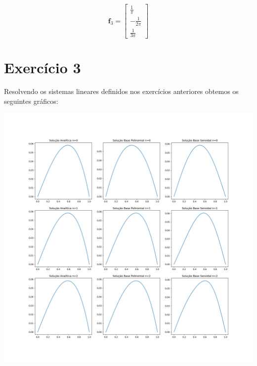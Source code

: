 \documentclass{article}
\begin{document}
\[
\mathbf{f}_{3} = \begin{bmatrix}
    \frac{1}{\pi} \\
    -\frac{1}{2\pi} \\
    \frac{1}{3\pi}
    \end{bmatrix}
\]

\section{Exercício 3}
Resolvendo os sistemas lineares definidos nos exercícios anteriores obtemos os seguintes gráficos:

\begin{center}
    \includegraphics[width=1\textwidth]{exercicio123_solucao.png}
\end{center}
\end{document}
